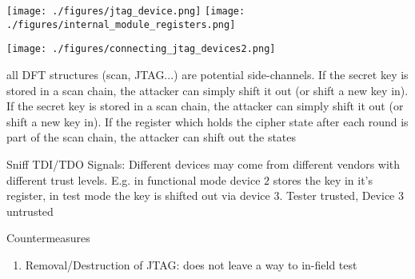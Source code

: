 \documentclass[landscape, a4paper]{article}
\begin{document}
\begin{minipage}[t]{0.2\linewidth}
	\begin{betterlist}
		\item \begin{minipage}[b]{0.3\linewidth}
			\texttt{[image: ./figures/jtag\_device.png]}
			\texttt{[image: ./figures/internal\_module\_registers.png]}
		\end{minipage}
		\begin{minipage}[b]{0.7\linewidth}
			\texttt{[image: ./figures/connecting\_jtag\_devices2.png]}
		\end{minipage}
	\end{betterlist}
	\begin{betterlist}
		\item all DFT structures (scan, JTAG...) are potential side-channels. If the secret key is stored in a scan chain, the attacker can simply shift it out (or shift a new key in). If the secret key is stored in a scan chain, the attacker can simply shift it out (or shift a new key in). If the register which holds the cipher state after each round is part of the scan chain, the attacker can shift out the states
		\item \alert{Sniff TDI/TDO Signals:} Different devices may come from different vendors with different trust levels. E.g. in functional mode device $2$ stores the key in it's register, in test mode the key is shifted out via device $3$. Tester trusted, Device $3$ untrusted
		\item \alert{Countermeasures}
		\begin{enumerate}
			\item \alert{Removal/Destruction of JTAG:} does not leave a way to in-field test
\end{enumerate}
\end{betterlist}
\end{minipage}
\end{document}
